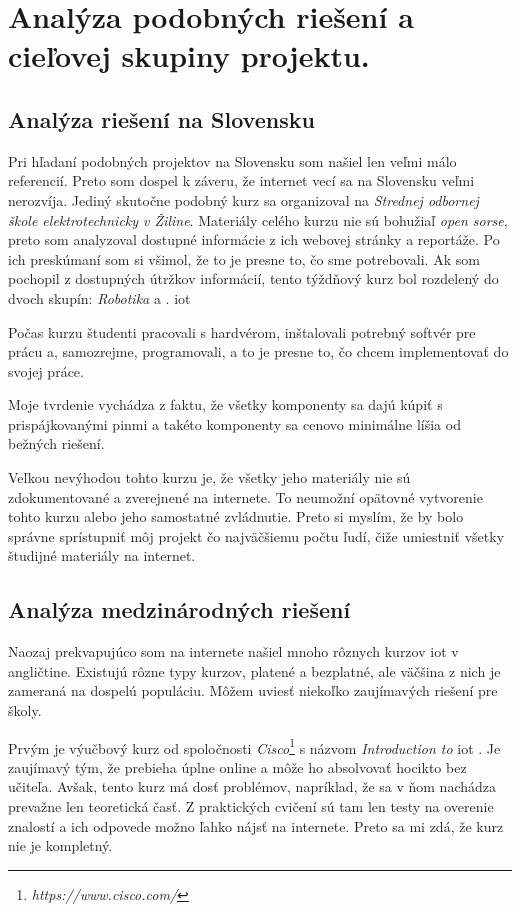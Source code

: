 \section{Analýza podobných riešení a cieľovej skupiny projektu.}
\subsection{Analýza riešení na Slovensku}
Pri hľadaní podobných projektov na Slovensku som našiel len veľmi málo referencií. Preto som dospel k záveru, že internet vecí sa na Slovensku veľmi nerozvíja. Jediný skutočne podobný kurz sa organizoval na \textit{Strednej odbornej škole elektrotechnicky v Žiline}\cite{slovakKurz}. Materiály celého kurzu nie sú bohužiaľ \textit{open sorse}, preto som analyzoval dostupné informácie z ich webovej stránky a reportáže. Po ich preskúmaní som si všimol, že to je presne to, čo sme potrebovali. Ak som pochopil z dostupných útržkov informácií, tento týždňový kurz bol rozdelený do dvoch skupín: \textit{Robotika} a \textit{}. \gls{iot}

Počas kurzu študenti pracovali s hardvérom, inštalovali potrebný softvér pre prácu a, samozrejme, programovali, a to je presne to, čo chcem implementovať do svojej práce. 

Moje tvrdenie vychádza z faktu, že všetky komponenty sa dajú kúpiť s prispájkovanými pinmi a takéto komponenty sa cenovo minimálne líšia od bežných riešení.

Veľkou nevýhodou tohto kurzu je, že všetky jeho materiály nie sú zdokumentované a zverejnené na internete.  To neumožní opätovné vytvorenie tohto kurzu alebo jeho samostatné zvládnutie. Preto si myslím, že by bolo správne sprístupniť môj projekt čo najväčšiemu počtu ľudí, čiže umiestniť všetky študijné materiály na internet.


\subsection{Analýza medzinárodných riešení}
Naozaj prekvapujúco som na internete našiel mnoho rôznych kurzov \gls{iot} v angličtine. Existujú rôzne typy kurzov, platené a bezplatné, ale väčšina z nich je zameraná na dospelú populáciu. Môžem uviesť niekoľko zaujímavých riešení pre školy.

Prvým je výučbový kurz od spoločnosti \textit{Cisco}\footnote{\textit{https://www.cisco.com/}} s názvom \textit{Introduction to} \gls{iot} \cite{ciscoKurz}. Je zaujímavý tým, že prebieha úplne online a môže ho absolvovať hocikto bez učiteľa. Avšak, tento kurz má dosť problémov, napríklad, že sa v ňom nachádza prevažne len teoretická časť. Z praktických cvičení sú tam len testy na overenie znalostí a ich odpovede možno ľahko nájsť na internete. Preto sa mi zdá, že kurz nie je kompletný. 

